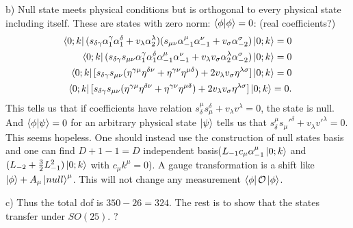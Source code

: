 \documentclass[12pt]{article}
\begin{document}
\begin{paragraph}{b)}
Null state meets physical conditions but is orthogonal to every physical state including itself. These are states with zero norm: $\bra{\phi}\ket{\phi}=0$: (real coefficients?)
\begin{equation}
\begin{aligned}[t]
\bra{0;k}(s_{\delta\gamma}\alpha_{1}^\gamma\alpha_{1}^\delta+v_\lambda\alpha_{2}^\lambda)(s_{\mu\nu}\alpha_{-1}^\mu\alpha_{-1}^\nu+v_\sigma\alpha_{-2}^\sigma)\ket{0;k}=0\\
\bra{0;k}(s_{\delta\gamma} s_{\mu\nu} \alpha_1^\gamma\alpha_1^\delta\alpha_{-1}^\mu\alpha_{-1}^\nu+v_\lambda v_\sigma \alpha_2^\lambda \alpha_{-2}^\sigma)\ket{0;k}=0\\
\bra{0;k}[s_{\delta\gamma} s_{\mu\nu} (\eta^{\gamma\mu}\eta^{\delta\nu}+\eta^{\gamma\nu}\eta^{\mu\delta}) +2 v_\lambda v_\sigma \eta^{\lambda\sigma}]\ket{0;k}=0\\
\bra{0;k}[s_{\delta\gamma} s_{\mu\nu} (\eta^{\gamma\mu}\eta^{\delta\nu}+\eta^{\gamma\nu}\eta^{\mu\delta}) +2 v_\lambda v_\sigma \eta^{\lambda\sigma}]\ket{0;k}=0.
\end{aligned}
\end{equation}
This tells us that if coefficients have relation $s_\delta^\mu s_\mu^\delta+v_\lambda v^\lambda=0$, the state is null. And $\bra{\phi}\ket{\psi}=0$ for an arbitrary physical state $\ket{\psi}$ tells us that $s_\delta^\mu s_\mu'^\delta+v_\lambda v'^{\lambda}=0$.\\

This seems hopeless. One should instead use the construction of null states basis and one can find $D+1-1=D$ independent basis($L_{-1}c_\mu\alpha_{-1}^\mu\ket{0;k}$ and $(L_{-2}+\frac{3}{2}L_{-1}^2)\ket{0;k}$ with $c_\mu k^\mu=0$). A gauge transformation is a shift like $\ket{\phi}+A_\mu\ket{null}^\mu$. This will not change any measurement $\bra{\phi}\mathcal{O}\ket{\phi}$.
\end{paragraph}
\begin{paragraph}{c)}
Thus the total dof is $350-26=324$. The rest is to show that the states transfer under $SO(25)$. ?
\end{paragraph}
\end{document}
